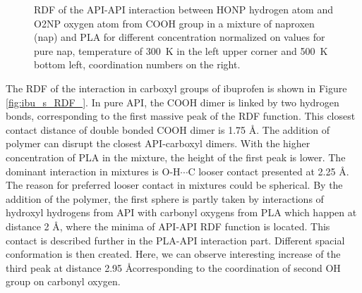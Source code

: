 \begin{figure}[H]
	\vspace{-0.3cm}
	\caption{RDF of the API-API interaction between HONP hydrogen atom and O2NP oxygen atom from COOH group in a mixture of naproxen (nap) and PLA for different concentration normalized on values for pure nap, temperature of 300~K in the left upper corner and 500~K bottom left, coordination numbers on the right.}
	\label{fig:nap_RDF_}
\end{figure}

The RDF of the interaction in carboxyl groups of ibuprofen is shown in Figure \ref{fig:ibu_s_RDF_}. In pure API, the COOH dimer is linked by two hydrogen bonds, corresponding to the first massive peak of the RDF function. This closest contact distance of double bonded COOH dimer is 1.75 \AA. The addition of polymer can disrupt the closest API-carboxyl dimers. With the higher concentration of PLA in the mixture, the height of the first peak is lower. The dominant interaction in mixtures is O-H$\cdots$C looser contact presented at 2.25 \AA. The reason for preferred looser contact in mixtures could be spherical. By the addition of the polymer, the first sphere is partly taken by interactions of hydroxyl hydrogens from API with carbonyl oxygens from PLA which happen at distance 2 \AA, where the minima of API-API RDF function is located. This contact is described further in the PLA-API interaction part. Different spacial conformation is then created. Here, we can observe interesting increase of the third peak at distance 2.95 \AA corresponding to the coordination of second OH group on carbonyl oxygen.

